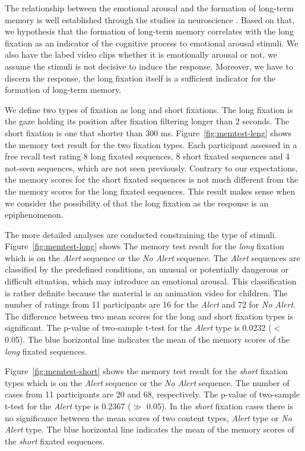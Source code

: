 \documentclass[10pt,letterpaper]{article}
\begin{document}
The relationship between the emotional arousal and the formation of long-term memory is well established through the studies in neuroscience \cite{Cahill1996amyg,Cahill1998baso}. Based on that, we hypothesis that the formation of long-term memory correlates with the long fixation as an indicator of the cognitive process to emotional arousal stimuli. We also have the labed video clips whether it is emotionally arousal or not, we assume the stimuli is not decisive to induce the response. Moreover, we have to discern the response, the long fixation itself is a sufficient indicator for the formation of long-term memory.

We define two types of fixation as long and short fixations. The long fixation is the gaze holding its position after fixation filtering longer than 2 seconds. The short fixation is one that shorter than 300 ms. Figure~\ref{fig:memtest-leng} shows the memory test result for the two fixation types. Each participant assessed in a free recall test rating 8 long fixated sequences, 8 short fixated sequences and 4 not-seen sequences, which are not seen previously. Contrary to our expectations, the memory scores for the short fixated sequences is not much different from the the memory scores for the long fixated sequences. This result makes sense when we consider the possibility of that the long fixation as the response is an epiphenomenon. 

The more detailed analyses are conducted constraining the type of stimuli.
Figure~\ref{fig:memtest-long} shows The memory test result for the \textit{long} fixation which is on the \textit{Alert} sequence or the \textit{No Alert} sequence. The \textit{Alert} sequences are classified by the predefined conditions, an unusual or potentially dangerous or difficult situation, which may introduce an emotional arousal. This classification is rather definite because the material is an animation video for children. The number of ratings from 11 participants are 16 for the \textit{Alert} and 72 for \textit{No Alert}. The difference between two mean scores for the long and short fixation types is significant. The p-value of two-sample t-test for the \textit{Alert} type is 0.0232 ($<$ 0.05). The blue horizontal line indicates the mean of the memory scores of the \textit{long} fixated sequences.

Figure~\ref{fig:memtest-short} shows the memory test result for the \textit{short} fixation types which is on the \textit{Alert} sequence or the \textit{No Alert} sequence. The number of cases from 11 participants are 20 and 68, respectively. The p-value of two-sample t-test for the \textit{Alert} type is 0.2367 ($\gg$ 0.05). In the \textit{short} fixation cases there is no significance between the mean scores of two content types, \textit{Alert} type or \textit{No Alert} type. The blue horizontal line indicates the mean of the memory scores of the \textit{short} fixated sequences.
\end{document}
